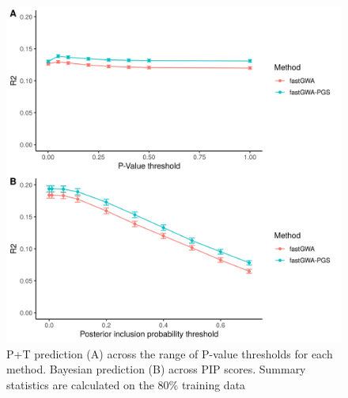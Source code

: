 \documentclass[fleqn,10pt]{wlscirep}
\begin{document}
\begin{figure}
\centering
\includegraphics[width=120mm]{images/Fig5}
\caption{P+T prediction (A) across the range of P-value thresholds for each method. Bayesian prediction (B) across PIP scores. Summary statistics are calculated on the 80\% training data}
\label{fig:prediction analysis}
\end{figure}
\end{document}

